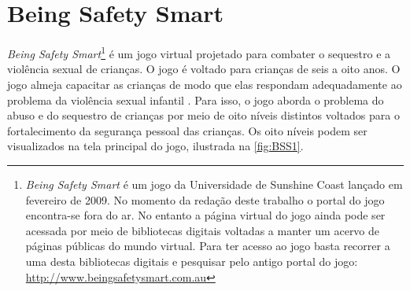 


\section{Being Safety Smart}\label{sssec:Being}


\textit{Being Safety Smart}\footnote{\textit{Being Safety Smart} é um jogo  da Universidade de Sunshine Coast lançado em fevereiro de 2009. No momento da redação deste trabalho o portal do jogo encontra-se fora do ar. No entanto a página virtual do jogo ainda pode ser acessada por meio de bibliotecas digitais voltadas a manter um acervo de páginas públicas do mundo virtual. Para ter acesso ao jogo basta recorrer a uma desta bibliotecas digitais e pesquisar pelo antigo portal do jogo: \url{http://www.beingsafetysmart.com.au}} é um jogo virtual projetado para combater o sequestro e a violência sexual de crianças. O jogo é voltado para crianças de seis a oito anos. O jogo almeja capacitar as crianças de modo que elas respondam adequadamente ao problema da violência sexual infantil \cite{jones2008online}. Para isso, o jogo aborda  o problema do abuso e do sequestro de crianças por meio de oito níveis distintos voltados para o fortalecimento da segurança pessoal das crianças. Os oito níveis podem ser visualizados na tela principal do jogo, ilustrada na \autoref{fig:BSS1}. 

